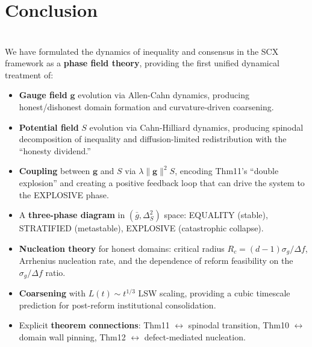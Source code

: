 \documentclass[12pt,a4paper]{article}
\theoremstyle{plain}
\theoremstyle{definition}
\newcommand{\gf}{\mathbf{g}}          %
\newcommand{\Sf}{S}                   %
\newcommand{\Rc}{R_c}                 %
\newcommand{\gbar}{\bar{g}}           %
\newcommand{\cn}[1]{\textcolor{scxgray}{\textit{#1}}}
\begin{document}
\bigskip
\noindent
\cn{}

\section{Conclusion}
\section*{}

We have formulated the dynamics of inequality and consensus in the SCX
framework as a \textbf{phase field theory}, providing the first unified
dynamical treatment of:

\begin{itemize}
    \item \textbf{Gauge field} $\gf$ evolution via Allen-Cahn dynamics,
          producing honest/dishonest domain formation and curvature-driven coarsening.

    \item \textbf{Potential field} $\Sf$ evolution via Cahn-Hilliard dynamics,
          producing spinodal decomposition of inequality and diffusion-limited
          redistribution with the ``honesty dividend.''

    \item \textbf{Coupling} between $\gf$ and $\Sf$ via $\lambda\|\gf\|^2\Sf$,
          encoding Thm11's ``double explosion'' and creating a positive feedback
          loop that can drive the system to the EXPLOSIVE phase.

    \item A \textbf{three-phase diagram} in $(\gbar,\Delta_S^2)$ space: EQUALITY
          (stable), STRATIFIED (metastable), EXPLOSIVE (catastrophic collapse).

    \item \textbf{Nucleation theory} for honest domains: critical radius
          $\Rc = (d-1)\sigma_g/\Delta f$, Arrhenius nucleation rate, and the
          dependence of reform feasibility on the $\sigma_g/\Delta f$ ratio.

    \item \textbf{Coarsening} with $L(t) \sim t^{1/3}$ LSW scaling, providing
          a cubic timescale prediction for post-reform institutional consolidation.

    \item Explicit \textbf{theorem connections}: Thm11 $\leftrightarrow$ spinodal
          transition, Thm10 $\leftrightarrow$ domain wall pinning, Thm12
          $\leftrightarrow$ defect-mediated nucleation.
\end{itemize}
\end{document}
